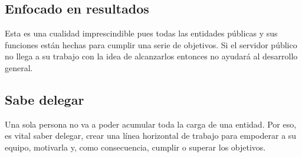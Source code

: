 \documentclass[
  a4paper,
]{article}
\begin{document}
\hypertarget{enfocado-en-resultados}{%
\subsection{Enfocado en resultados}\label{enfocado-en-resultados}}

Esta es una cualidad imprescindible pues todas las entidades públicas y
sus funciones están hechas para cumplir una serie de objetivos. Si el
servidor público no llega a su trabajo con la idea de alcanzarlos
entonces no ayudará al desarrollo general.

\hypertarget{sabe-delegar}{%
\subsection{Sabe delegar}\label{sabe-delegar}}

Una sola persona no va a poder acumular toda la carga de una entidad.
Por eso, es vital saber delegar, crear una línea horizontal de trabajo
para empoderar a su equipo, motivarla y, como consecuencia, cumplir o
superar los objetivos.


\printbibliography
\end{document}
